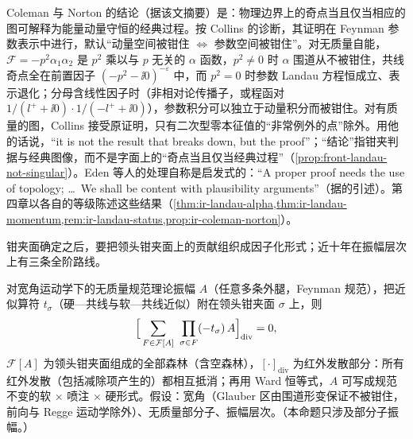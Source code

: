 \begin{remark}\label{rem:front-cn-history}
Coleman 与 Norton 的结论（据该文摘要）是：物理边界上的奇点当且仅当相应的图可解释为能量动量守恒的经典过程\cite{ColemanNorton1965}。按 Collins 的诊断\cite[第~I、IV~节，附录~D]{Collins:2020euz}，其证明在 Feynman 参数表示中进行，默认“动量空间被钳住 $\Leftrightarrow$ 参数空间被钳住”。对无质量自能，$\mathcal F=-p^2\alpha_1\alpha_2$ 是 $p^2$ 乘以与 $p$ 无关的 $\alpha$ 函数，$p^2\ne0$ 时 $\alpha$ 围道从不被钳住，共线奇点全在前置因子 $(-p^2-\ii0)^{-\varepsilon}$ 中，而 $p^2=0$ 时参数 Landau 方程恒成立、表示退化；分母含线性因子时（非相对论传播子，或程函对 $1/(l^++\ii0)\cdot1/(-l^++\ii0)$），参数积分可以独立于动量积分而被钳住\cite[附录~D.2]{Collins:2020euz}。对有质量的图，Collins 接受原证明，只有二次型零本征值的“非常例外的点”除外。用他的话说，“it is not the result that breaks down, but the proof”\cite[第~IV~节]{Collins:2020euz}；“结论”指钳夹判据与经典图像，而不是字面上的“奇点当且仅当经典过程”（\cref{prop:front-landau-not-singular}）。Eden 等人的处理自称是启发式的：“A proper proof needs the use of topology; \dots\ We shall be content with plausibility arguments”\cite[第~48~页]{EdenEtAl1966}（据\cite[第~5.4.3~节]{Collins2011}的引述）。第四章以各自的等级陈述这些结果（\cref{thm:ir-landau-alpha,thm:ir-landau-momentum,rem:ir-landau-status,prop:ir-coleman-norton}）。
\end{remark}

钳夹面确定之后，要把领头钳夹面上的贡献组织成因子化形式；近十年在振幅层次上有三条全阶路线。

\begin{proposition}\label{prop:front-ir-forest}
对宽角运动学下的无质量规范理论振幅 $A$（任意多条外腿，Feynman 规范），把近似算符 $t_\sigma$（硬—共线与软—共线近似）附在领头钳夹面 $\sigma$ 上，则
\begin{equation}\label{eq:front-forest}
\Bigl[\,\sum_{F\in\mathcal F[A]}\ \prod_{\sigma\in F}(-t_\sigma)\,A\Bigr]_{\mathrm{div}}=0,
\end{equation}
$\mathcal F[A]$ 为领头钳夹面组成的全部森林（含空森林），$[\cdot]_{\mathrm{div}}$ 为红外发散部分：所有红外发散（包括减除项产生的）都相互抵消；再用 Ward 恒等式，$A$ 可写成规范不变的软 $\times$ 喷注 $\times$ 硬形式\cite[式~(1.1)、(5.28)]{Ma2020}。假设：宽角（Glauber 区由围道形变保证不被钳住，前向与 Regge 运动学除外）、无质量部分子、振幅层次。（本命题只涉及部分子振幅。）
\end{proposition}

